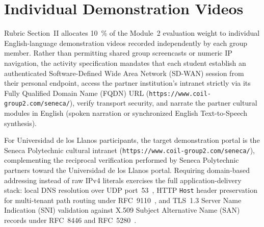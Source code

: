 \section{Individual Demonstration Videos}
\label{sec:demo_videos}

Rubric Section~II allocates \qty{10}{\percent} of the Module~2 evaluation weight to individual English-language demonstration videos recorded independently by each group member. Rather than permitting shared group screencasts or numeric IP navigation, the activity specification mandates that each student establish an authenticated Software-Defined Wide Area Network (SD-WAN) session from their personal endpoint, access the partner institution's intranet strictly via its Fully Qualified Domain Name (FQDN) URL (\texttt{https://\allowbreak www.coil-group2.com/\allowbreak seneca/}), verify transport security, and narrate the partner cultural modules in English (spoken narration or synchronized English Text-to-Speech synthesis).

For Universidad de los Llanos participants, the target demonstration portal is the Seneca Polytechnic cultural intranet (\texttt{https://\allowbreak www.coil-group2.com/\allowbreak seneca/}), complementing the reciprocal verification performed by Seneca Polytechnic partners toward the Universidad de los Llanos portal. Requiring domain-based addressing instead of raw IPv4 literals exercises the full application-delivery stack: local DNS resolution over UDP port~53~\cite{rfc1035}, HTTP \texttt{Host} header preservation for multi-tenant path routing under RFC~9110~\cite{rfc9110}, and TLS~1.3 Server Name Indication (SNI) validation against X.509 Subject Alternative Name (SAN) records under RFC~8446 and RFC~5280~\cite{rfc8446,rfc5280}.

